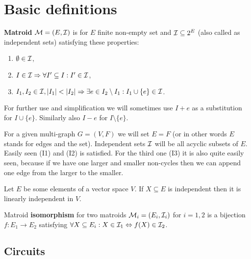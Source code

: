 \chapter{Basic definitions}

\begin{defn}
	\textbf{Matroid} $\mathcal{M} = (E, \mathcal{I})$ is for $E$ finite non-empty set and $\mathcal{I} \subseteq 2^E$ (also called as independent sets) satisfying these properties:
	
	\begin{enumerate}[(\text{I}1)]
		\item $\emptyset \in \mathcal{I}$,
		\item $I \in \mathcal{I} \Rightarrow \forall I' \subseteq I : I' \in \mathcal{I}$,
		\item $I_1, I_2 \in \mathcal{I}, \left|{I_1}\right| < \left|{I_2}\right| \Rightarrow \exists e \in I_2 \setminus I_1: I_1 \cup \{e\} \in \mathcal{I}$.
	\end{enumerate}
\end{defn}

\begin{notation}
	For further use and simplification we will sometimes use $I + e$ as a substitution for $I \cup \{e\}$. Similarly also $I - e$ for $I \setminus \{e\}$.
\end{notation}

\begin{example}
	For a given multi-graph $G = (V,F)$ we will set $E = F$ (or in other words $E$ stands for edges and the set). Independent sets $\mathcal{I}$ will be all acyclic subsets of $E$. Easily seen (I1) and (I2) is satisfied. For the third one (I3) it is also quite easily seen, because if we have one larger and smaller non-cycles then we can append one edge from the larger to the smaller.
\end{example}

\begin{example}
	Let $E$ be some elements of a vector space $V$. If $X \subseteq E$ is independent then it is linearly independent in $V$.
\end{example}

\begin{defn}
	Matroid \textbf{isomorphism} for two matroids $\mathcal{M}_i = (E_i, \mathcal{I}_i)$ for $i = 1,2$ is a bijection $f: E_1 \to E_2$ satisfying $\forall X \subseteq E_i : X \in \mathcal{I}_1 \Leftrightarrow f(X) \in \mathcal{I}_2$.
\end{defn}

\section{Circuits}

